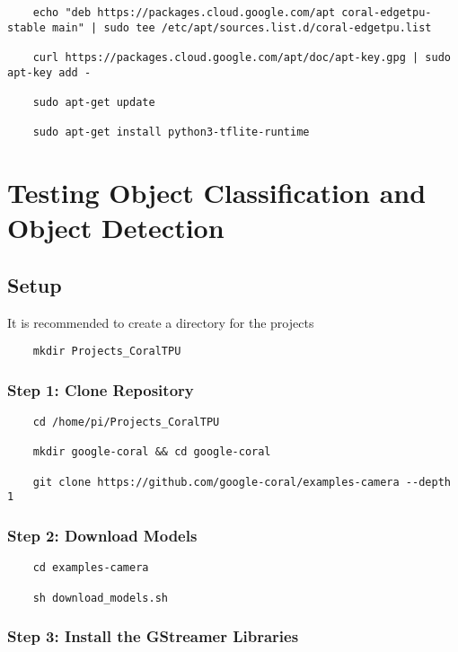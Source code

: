 \begin{verbatim}
	echo "deb https://packages.cloud.google.com/apt coral-edgetpu-stable main" | sudo tee /etc/apt/sources.list.d/coral-edgetpu.list
	
	curl https://packages.cloud.google.com/apt/doc/apt-key.gpg | sudo apt-key add -
	
	sudo apt-get update
	
	sudo apt-get install python3-tflite-runtime
\end{verbatim}

\section{Testing Object Classification and Object Detection}

\subsection{Setup}

It is recommended to create a directory for the projects

\begin{verbatim}
	mkdir Projects_CoralTPU
\end{verbatim}

\subsubsection{Step 1: Clone Repository}


\begin{verbatim}
	cd /home/pi/Projects_CoralTPU
	
	mkdir google-coral && cd google-coral
	
	git clone https://github.com/google-coral/examples-camera --depth 1
\end{verbatim}


\subsubsection{Step 2: Download Models}

\begin{verbatim}
	cd examples-camera
	
	sh download_models.sh
\end{verbatim}


\subsubsection{Step 3: Install the GStreamer Libraries}

